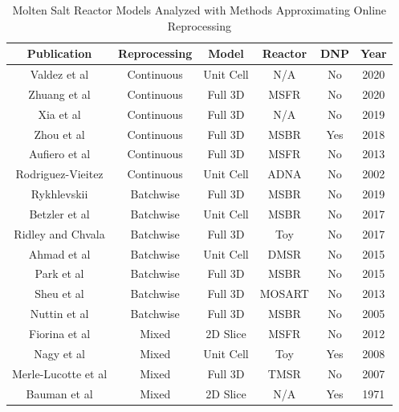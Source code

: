 \begin{table}[H]
\renewcommand{\arraystretch}{1.25}
\caption{Molten Salt Reactor Models Analyzed with Methods Approximating Online Reprocessing}
\label{tab:codes_types}
\begin{center}
\begin{tabular}{  c | c | c | c | c | c}
 \hline
 Publication & Reprocessing & Model & Reactor & DNP & Year\\
 \hline
 \hline
 Valdez et al \cite{jr_vicente_valdez_modeling_2020} & Continuous & Unit Cell & N/A & No & 2020\\
 Zhuang et al \cite{zhuang_extended_2020} & Continuous & Full 3D & MSFR & No & 2020\\
 Xia et al \cite{xia_development_2019} & Continuous & Full 3D & N/A & No & 2019\\
 Zhou et al \cite{zhou_fuel_2018} & Continuous & Full 3D & MSBR & Yes & 2018\\
 Aufiero et al \cite{aufiero_extended_2013} & Continuous & Full 3D & MSFR & No & 2013\\
 Rodriguez-Vieitez \cite{rodriguez-vieitez_transmutation_2002} & Continuous & Unit Cell & ADNA & No & 2002\\
 \hline

 Rykhlevskii \cite{rykhlevskii_modeling_2019} & Batchwise & Full 3D & MSBR & No & 2019\\
 Betzler et al \cite{betzler_molten_2017} & Batchwise & Unit Cell & MSBR & No & 2017\\
 Ridley and Chvala \cite{ridley_method_2017} & Batchwise & Full 3D & Toy & No & 2017\\
 Ahmad et al \cite{ahmad_neutronics_2015} & Batchwise & Unit Cell & DMSR & No & 2015\\
 Park et al \cite{park_whole_2015} & Batchwise & Full 3D & MSBR & No & 2015\\
 Sheu et al \cite{sheu_depletion_2013} & Batchwise & Full 3D & MOSART & No & 2013\\
 Nuttin et al \cite{nuttin_potential_2005} & Batchwise & Full 3D & MSBR & No & 2005\\

 \hline
 Fiorina et al \cite{fiorina_preliminary_2012} & Mixed & 2D Slice & MSFR & No & 2012\\
 Nagy et al \cite{nagy_parametric_2008} & Mixed & Unit Cell & Toy & Yes & 2008\\
 Merle-Lucotte et al \cite{merle-lucotte_thorium_2007} & Mixed & Full 3D & TMSR & No & 2007\\
 Bauman et al \cite{h_f_bauman_rod_1971} & Mixed & 2D Slice & N/A & Yes & 1971\\

 \hline
\end{tabular}
\end{center}
\end{table}

